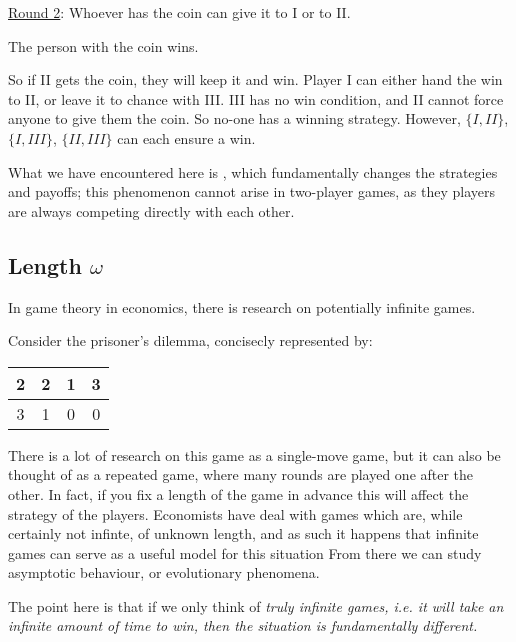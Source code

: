 \documentclass[]{article}
\begin{document}
\underline{Round 2}: Whoever has the coin can give it to I or to II.

The person with the coin wins.

So if II gets the coin, they will keep it and win. Player I can either hand the win to II, or leave it to chance with III. III has no win condition, and II cannot force anyone to give them the coin. So no-one has a winning strategy. However,  $\{I,II\}$, $\{I,III\}$, $\{II,III\}$ can each ensure a win.

What we have encountered here is , which fundamentally changes the strategies and payoffs; this phenomenon cannot arise in two-player games, as they players are always competing directly with each other.

\subsection{Length $\omega$}

In game theory in economics, there is research on potentially infinite games.

Consider the prisoner's dilemma, concisecly represented by:

\begin{center}
    \begin{tabular}{cc|cc}
        2 & 2 & 1 & 3 \\ \hline
        3 & 1 & 0 & 0
    \end{tabular}
\end{center}

There is a lot of research on this game as a single-move game, but it can also be thought of as a repeated game, where many rounds are played one after the other. In fact, if you fix a length of the game in advance this will affect the strategy of the players. Economists have deal with games which are, while certainly not infinte, of unknown length, and as such it happens that infinite games can serve as a useful model for this situation From there we can study asymptotic behaviour, or evolutionary phenomena.

The point here is that if we only think of \it{truly} infinite games, \it{i.e.} it will take an infinite amount of time to win, then the situation is fundamentally different.
\end{document}
